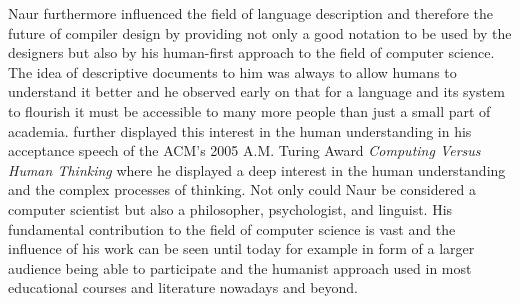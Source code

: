 \documentclass{article}
\begin{document}
Naur furthermore influenced the field of language description and therefore the future of compiler design by providing not only a good notation to be used by the designers but also by his human-first approach to the field of computer science. The idea of descriptive documents to him was always to allow humans to understand it better and he observed early on that for a language and its system to flourish it must be accessible to many more people than just a small part of academia. \cite{naur2007computing} further displayed this interest in the human understanding in his acceptance speech of the ACM's 2005 A.M. Turing Award \textit{Computing Versus Human Thinking} where he displayed a deep interest in the human understanding and the complex processes of thinking. Not only could Naur be considered a computer scientist but also a philosopher, psychologist, and linguist. His fundamental contribution to the field of computer science is vast and the influence of his work can be seen until today for example in form of a larger audience being able to participate and the humanist approach used in most educational courses and literature nowadays and beyond.



\end{document}
